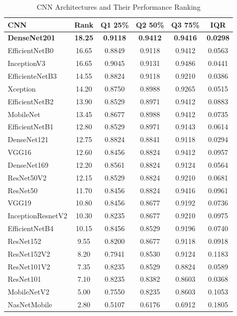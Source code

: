 \documentclass[preprint,12pt]{elsarticle}
\begin{document}
\begin{table}[h!]
	\caption{CNN Architectures and Their Performance Ranking}
	\label{tab:Reference_ranking}
	\centering
	\begin{tabular}{|l|c|c|c|c|c|}
		\hline
		\textbf{CNN} & \textbf{Rank} & \textbf{Q1 25\%} & \textbf{Q2 50\%} & \textbf{Q3 75\%} & \textbf{IQR} \\
		\hline
		\textbf{DenseNet201} & \textbf{18.25} & \textbf{0.9118} & \textbf{0.9412} & \textbf{0.9416} & \textbf{0.0298} \\
		EfficientNetB0 & 16.65 & 0.8849 & 0.9118 & 0.9412 & 0.0563 \\
		InceptionV3 & 16.65 & 0.9045 & 0.9131 & 0.9486 & 0.0441 \\
		EfficienteNetB3 & 14.55 & 0.8824 & 0.9118 & 0.9210 & 0.0386 \\
		Xception & 14.20 & 0.8750 & 0.8988 & 0.9265 & 0.0515 \\
		EfficientNetB2 & 13.90 & 0.8529 & 0.8971 & 0.9412 & 0.0883 \\
		MobileNet & 13.45 & 0.8677 & 0.8988 & 0.9412 & 0.0735 \\
		EfficientNetB1 & 12.80 & 0.8529 & 0.8971 & 0.9143 & 0.0614 \\
		DenseNet121 & 12.75 & 0.8824 & 0.8841 & 0.9118 & 0.0294 \\
		VGG16 & 12.60 & 0.8456 & 0.8824 & 0.9412 & 0.0957 \\
		DenseNet169 & 12.20 & 0.8561 & 0.8824 & 0.9124 & 0.0564 \\
		ResNet50V2 & 12.15 & 0.8529 & 0.8824 & 0.9210 & 0.0681 \\
		ResNet50 & 11.70 & 0.8456 & 0.8824 & 0.9416 & 0.0961 \\
		VGG19 & 10.80 & 0.8456 & 0.8677 & 0.9192 & 0.0736 \\
		InceptionResnetV2 & 10.30 & 0.8235 & 0.8677 & 0.9210 & 0.0975 \\
		EfficientNetB4 & 10.15 & 0.8456 & 0.8529 & 0.9196 & 0.0740 \\
		ResNet152 & 9.55 & 0.8200 & 0.8677 & 0.9118 & 0.0918 \\
		ResNet152V2 & 8.20 & 0.7941 & 0.8530 & 0.9124 & 0.1183 \\
		ResNet101V2 & 7.35 & 0.8235 & 0.8529 & 0.8824 & 0.0589 \\
		ResNet101 & 7.10 & 0.8235 & 0.8382 & 0.8603 & 0.0368 \\
		MobileNetV2 & 5.00 & 0.7550 & 0.8235 & 0.8603 & 0.1053 \\
		NasNetMobile & 2.80 & 0.5107 & 0.6176 & 0.6912 & 0.1805 \\
		\hline
	\end{tabular}
\end{table}
\end{document}
